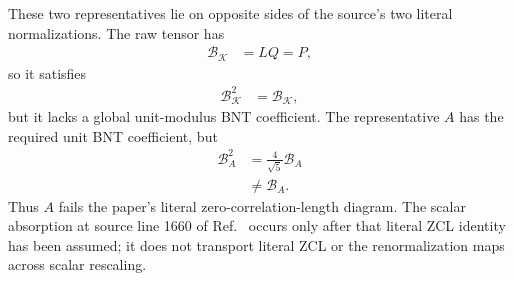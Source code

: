 \documentclass{article}
\begin{document}
These two representatives lie on opposite sides of the source's two literal
normalizations. The raw tensor has
\begin{align}
    \mathcal B_{\mathcal K}
        &= LQ
         = P,
    \label{eq:cpgsv17_raw_physical_transfer_projection}
\end{align}
so it satisfies
\begin{align}
    \mathcal B_{\mathcal K}^2
        &= \mathcal B_{\mathcal K},
    \label{eq:cpgsv17_raw_literal_zcl}
\end{align}
but it lacks a global unit-modulus BNT coefficient. The representative $A$
has the required unit BNT coefficient, but
\begin{align}
    \mathcal B_A^2
        &= \frac4{\sqrt5}\mathcal B_A
    \label{eq:cpgsv17_normalized_scaled_zcl}\\
        &\neq \mathcal B_A.
    \label{eq:cpgsv17_normalized_literal_zcl_failure}
\end{align}
Thus $A$ fails the paper's literal zero-correlation-length diagram. The scalar
absorption at source line 1660 of Ref.~\cite{Cirac2016MPDO_arXiv} occurs only
after that literal ZCL identity has been assumed; it does not transport
literal ZCL or the renormalization maps across scalar rescaling.
\end{document}
